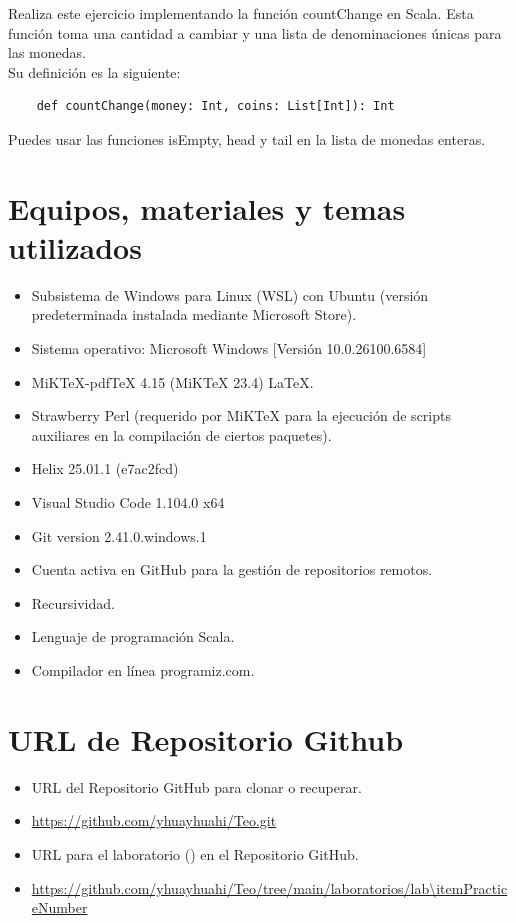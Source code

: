 Realiza este ejercicio implementando la función countChange en Scala.
Esta función toma una cantidad a cambiar y una lista de denominaciones únicas para las
monedas.\\

Su definición es la siguiente:

\begin{verbatim}
    def countChange(money: Int, coins: List[Int]): Int
\end{verbatim}

Puedes usar las funciones isEmpty, head y tail en la lista de monedas enteras.



\section{Equipos, materiales y temas utilizados}

\begin{itemize}
    \item Subsistema de Windows para Linux (WSL) con Ubuntu (versión predeterminada instalada mediante Microsoft Store).
    \item Sistema operativo: Microsoft Windows [Versión 10.0.26100.6584]
    \item MiKTeX-pdfTeX 4.15 (MiKTeX 23.4) \LaTeX.
    \item Strawberry Perl (requerido por MiKTeX para la ejecución de scripts auxiliares en la compilación de ciertos paquetes).
    \item Helix 25.01.1 (e7ac2fcd)
    \item Visual Studio Code 1.104.0 x64
    \item Git version 2.41.0.windows.1
    \item Cuenta activa en GitHub para la gestión de repositorios remotos.
    \item Recursividad.
    \item Lenguaje de programación Scala.
    \item Compilador en línea programiz.com.
\end{itemize}



\section{URL de Repositorio Github}

\begin{itemize}
    \item URL del Repositorio GitHub para clonar o recuperar.
    \item \url{https://github.com/yhuayhuahi/Teo.git}
    \item URL para el laboratorio (\itemPracticeNumber) en el Repositorio GitHub.
    \item \url{https://github.com/yhuayhuahi/Teo/tree/main/laboratorios/lab\itemPracticeNumber}
\end{itemize}



